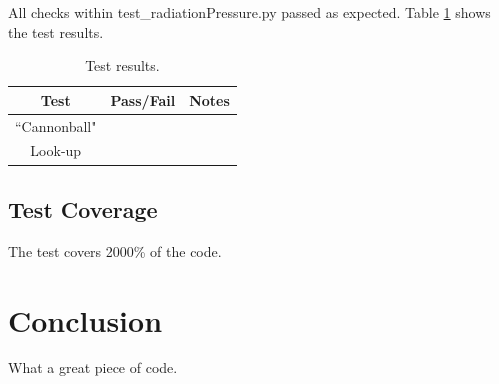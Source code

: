 \documentclass[]{BasiliskReportMemo}
\newcommand{\testname}{test\_radiationPressure.py }
\begin{document}
All checks within \testname passed as expected. Table \ref{tab:results} shows the test results.

\begin{table}[htbp]
	\caption{Test results.}
	\label{tab:results}
	\centering \fontsize{10}{10}\selectfont
	\begin{tabular}{c | c | c  } %
		\hline
		\textbf{Test} 				      & \textbf{Pass/Fail} 						   		   & \textbf{Notes} 									\\ \hline
		``Cannonball"	   			  	&      & 	 \\ \hline
		Look-up	   	                     &              &            \\ \hline
	\end{tabular}
\end{table}

\subsection{Test Coverage}
The test covers 2000\% of the code.
\section{Conclusion}
What a great piece of code.

{}

\end{document}
